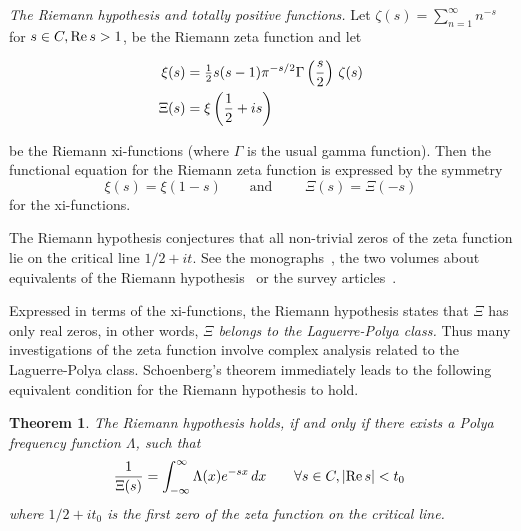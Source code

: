 \documentclass{article}
\newcommand{\tmem}[1]{{\em #1\/}}
\newtheorem{tm}{Theorem}
\newcommand{\fif}{if and only if}
\newtheorem{tm}{Theorem}
\providecommand{\*}{{\opl}}
\newcommand{\field}[1]{#1}
\newcommand{\bC}{\field{C}}
\newcommand{\<}{}
\newcommand{\>}{}
\newcommand{\tp}{totally positive}
\newcommand{\lpc}{Laguerre-Polya class}
\newcommand{\pff}{Polya frequency function}
\begin{document}
{\tmem{The Riemann hypothesis and {\tp} functions.}} Let $\zeta (s) = \sum_{n
= 1}^{\infty} n^{- s}$ for $s \in \bC, \mathrm{Re} \hspace{0.17em} s > 1$, be
the Riemann zeta function and let

\begin{align}
  \xi (s) & = \tfrac{1}{2} s (s - 1) \pi^{- s / 2} \Gamma \left( \frac{s}{2}
  \right)  \hspace{0.17em} \zeta (s)  \label{eq:6b}\\
  \Xi (s) & = \xi \left( \frac{1}{2} + is \right)  \label{eq:7}
\end{align}

be the Riemann xi-functions (where $\Gamma$ is the usual gamma function). Then
the functional equation for the Riemann zeta function is expressed by the
symmetry
\begin{equation}
  \label{eq:8} \xi (s) = \xi (1 - s)  \qquad \text{and } \qquad \Xi (s) = \Xi
  (- s)
\end{equation}
for the xi-functions.

The Riemann hypothesis conjectures that all non-trivial zeros of the zeta
function lie on the critical line $1 / 2 + it$. See the
monographs~{\cite{Iwa14,Ivi03,Tit86}}, the two volumes about equivalents of
the Riemann hypothesis~{\cite{Br17-1,Br17-2}} or the survey
articles~{\cite{Bom10,Conrey03}}.

Expressed in terms of the xi-functions, the Riemann hypothesis states that
$\Xi$ has only real zeros, in other words, {\tmem{$\Xi$ belongs to the
{\lpc}.}} Thus many investigations of the zeta function involve complex
analysis related to the {\lpc}. Schoenberg's theorem immediately leads to the
following equivalent condition for the Riemann hypothesis to hold.

\begin{tm}
  \label{tm:equi1}The Riemann hypothesis holds, {\fif} there exists a {\pff}
  $\Lambda$, such that
  \begin{equation}
    \label{eq:9} \frac{1}{\Xi (s)} = \int_{- \infty}^{\infty} \Lambda (x) e^{-
    sx}  \hspace{0.17em} dx \qquad \forall s \in \bC, | \mathrm{Re}
    \hspace{0.17em} s| < t_0 \hspace{0.17em}
  \end{equation}
  where $1 / 2 + it_0$ is the first zero of the zeta function on the critical
  line.
\end{tm}
\end{document}
